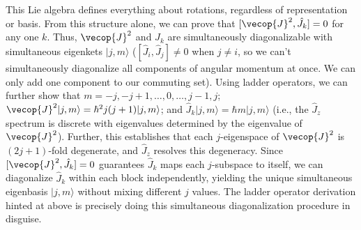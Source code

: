 This Lie algebra defines everything about rotations, regardless of representation or basis. From this structure alone, we can prove that $[\vecop{J}^2, \hat{J}_k]=0$ for any one $k$. Thus, $\vecop{J}^2$ and $\hat{J}_k$ are simultaneously diagonalizable with simultaneous eigenkets $|j, m\rangle$ ($[\hat{J}_i,\hat{J}_j]\ne 0$ when $j\ne i$, so we can't simultaneously diagonalize all components of angular momentum at once. We can only add one component to our commuting set). Using ladder operators, we can further show that $m=-j, -j+1, \dots,0, \dots,j-1,j$; $\vecop{J}^2|j, m\rangle=\hbar^2j(j+1)|j,m\rangle$; and $\hat{J}_k|j,m\rangle = \hbar m|j,m\rangle$ (i.e., the $\hat{J}_z$ spectrum is discrete with eigenvalues determined by the eigenvalue of $\vecop{J}^2$). Further, this establishes that each $j$-eigenspace of $\vecop{J}^2$ is $(2j+1)$-fold degenerate, and $\hat{J}_z$ resolves this degeneracy. Since $[\vecop{J}^2, \hat{J}_k]=0$ guarantees $\hat{J}_k$ maps each $j$-subspace to itself, we can diagonalize $\hat{J}_k$ within each block independently, yielding the unique simultaneous eigenbasis $|j, m\rangle$ without mixing different $j$ values. The ladder operator derivation hinted at above is precisely doing this simultaneous diagonalization procedure in disguise.\\

